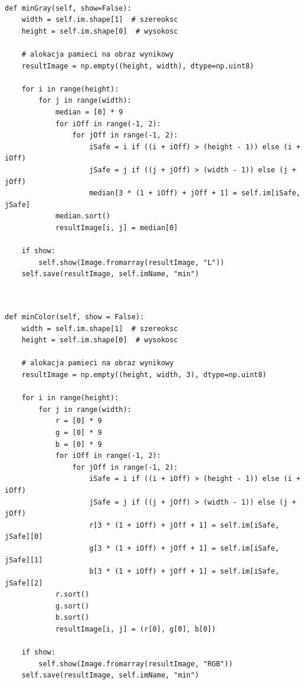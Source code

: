 \documentclass[final,a4paper,openany,12pt]{mwbk}
\begin{document}
\newpage

\begin{lstlisting}[caption=Filtr minimalny (obraz szary)]
	
def minGray(self, show=False):
	width = self.im.shape[1]  # szereoksc
	height = self.im.shape[0]  # wysokosc
	
	# alokacja pamieci na obraz wynikowy
	resultImage = np.empty((height, width), dtype=np.uint8)
	
	for i in range(height):
		for j in range(width):
			median = [0] * 9
			for iOff in range(-1, 2):
				for jOff in range(-1, 2):
					iSafe = i if ((i + iOff) > (height - 1)) else (i + iOff)
					jSafe = j if ((j + jOff) > (width - 1)) else (j + jOff)
					median[3 * (1 + iOff) + jOff + 1] = self.im[iSafe, jSafe]
			median.sort()
			resultImage[i, j] = median[0]
	
	if show:
		self.show(Image.fromarray(resultImage, "L"))
	self.save(resultImage, self.imName, "min")
	
\end{lstlisting}


\newpage

\begin{lstlisting}[caption=Filtr minimalny (obraz barwny)]
	
def minColor(self, show = False):
	width = self.im.shape[1]  # szereoksc
	height = self.im.shape[0]  # wysokosc
	
	# alokacja pamieci na obraz wynikowy
	resultImage = np.empty((height, width, 3), dtype=np.uint8)
	
	for i in range(height):
		for j in range(width):
			r = [0] * 9
			g = [0] * 9
			b = [0] * 9
			for iOff in range(-1, 2):
				for jOff in range(-1, 2):
					iSafe = i if ((i + iOff) > (height - 1)) else (i + iOff)
					jSafe = j if ((j + jOff) > (width - 1)) else (j + jOff)
					r[3 * (1 + iOff) + jOff + 1] = self.im[iSafe, jSafe][0]
					g[3 * (1 + iOff) + jOff + 1] = self.im[iSafe, jSafe][1]
					b[3 * (1 + iOff) + jOff + 1] = self.im[iSafe, jSafe][2]
			r.sort()
			g.sort()
			b.sort()
			resultImage[i, j] = (r[0], g[0], b[0])
	
	if show:
		self.show(Image.fromarray(resultImage, "RGB"))
	self.save(resultImage, self.imName, "min")
	
\end{lstlisting}
\newpage
\end{document}
